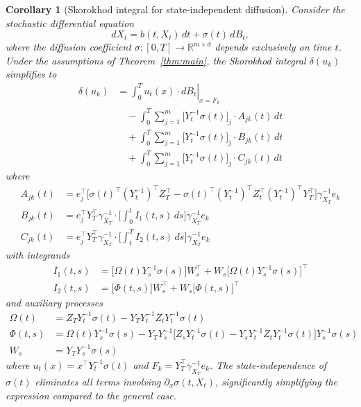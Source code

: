 \documentclass[]{interact}
\newcommand{\1}{\mathbf{1}}
\theoremstyle{plain}%
\newtheorem{corollary}[theorem]{Corollary}
\theoremstyle{definition}
\theoremstyle{remark}
\numberwithin{equation}{section}
\begin{document}
\begin{corollary}[Skorokhod integral for state-independent diffusion]
\label{cor:state_independent}
Consider the stochastic differential equation
\[dX_t = b(t, X_t) \, dt + \sigma(t) \, dB_t,\]
where the diffusion coefficient \(\sigma: [0, T] \to \mathbb{R}^{m \times d}\) depends exclusively on time \(t\). Under the assumptions of Theorem~\ref{thm:main}, the Skorokhod integral \(\delta(u_k)\) simplifies to
\begin{align*}
\delta(u_k) &= \left. \int_0^T u_t(x) \cdot dB_t \right|_{x=F_k} \\
&\quad - \int_0^T \sum_{j=1}^m \bigl[ Y_t^{-1} \sigma(t) \bigr]_j \cdot A_{jk}(t) \, dt \\
&\quad + \int_0^T \sum_{j=1}^m \bigl[ Y_t^{-1} \sigma(t) \bigr]_j \cdot B_{jk}(t) \, dt \\
&\quad + \int_0^T \sum_{j=1}^m \bigl[ Y_t^{-1} \sigma(t) \bigr]_j \cdot C_{jk}(t) \, dt
\end{align*}
where
\begin{align*}
A_{jk}(t) &= e_j^\top \bigg[ \sigma(t)^\top (Y_t^{-1})^\top Z_T^\top - \sigma(t)^\top (Y_t^{-1})^\top Z_t^\top (Y_t^{-1})^\top Y_T^\top \bigg] \gamma_{X_T}^{-1} e_k \\[0.5em]
B_{jk}(t) &= e_j^\top Y_T^\top \gamma_{X_T}^{-1} \cdot \bigg[ \int_0^t I_1(t,s) \, ds \bigg] \gamma_{X_T}^{-1} e_k \\[0.5em]
C_{jk}(t) &= e_j^\top Y_T^\top \gamma_{X_T}^{-1} \cdot \bigg[ \int_t^T I_2(t,s) \, ds \bigg] \gamma_{X_T}^{-1} e_k
\end{align*}
with integrands
\begin{align*}
I_1(t,s) &= \bigg[ \Omega(t) Y_s^{-1}\sigma(s) \bigg] W_s^\top + W_s \bigg[ \Omega(t) Y_s^{-1}\sigma(s) \bigg]^\top \\[0.5em]
I_2(t,s) &= \bigg[ \Phi(t,s) \bigg] W_s^\top + W_s \bigg[ \Phi(t,s) \bigg]^\top
\end{align*}
and auxiliary processes
\begin{align*}
\Omega(t) &= Z_T Y_t^{-1} \sigma(t) - Y_T Y_t^{-1} Z_t Y_t^{-1} \sigma(t) \\[0.5em]
\Phi(t,s) &= \Omega(t) Y_s^{-1}\sigma(s) - Y_T Y_s^{-1} \bigg[ Z_s Y_t^{-1} \sigma(t) - Y_s Y_t^{-1} Z_t Y_t^{-1} \sigma(t) \bigg] Y_s^{-1} \sigma(s) \\[0.5em]
W_s &= Y_T Y_s^{-1} \sigma(s)
\end{align*}
where \(u_t(x) = x^\top Y_t^{-1} \sigma(t)\) and \(F_k = Y_T^\top \gamma_{X_T}^{-1} e_k\). The state-independence of \(\sigma(t)\) eliminates all terms involving \(\partial_x \sigma(t, X_t)\), significantly simplifying the expression compared to the general case.
\end{corollary}
\end{document}
